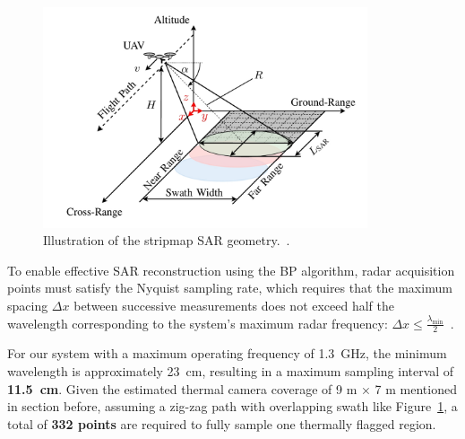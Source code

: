 \begin{figure}[H]
    \centering
    \includegraphics[height=6.5cm]{figs/Huirui/gpr_swath}
    \caption[Stripmap SAR geometry]{Illustration of the stripmap SAR geometry.~\cite{schartel2018uav}.}
    \label{fig:swath_geometry}
\end{figure}

To enable effective \gls{SAR} reconstruction using the \gls{BP} algorithm, radar acquisition points must satisfy the Nyquist sampling rate, which requires that the maximum spacing $\Delta x$ between successive measurements does not exceed half the wavelength corresponding to the system's maximum radar frequency: \(\Delta x \leq \frac{\lambda_{\text{min}}}{2}\)~\cite{9758040}.

For our system with a maximum operating frequency of 1.3~GHz, the minimum wavelength is approximately 23~cm, resulting in a maximum sampling interval of \textbf{11.5~cm}. Given the estimated thermal camera coverage of 9 m × 7 m mentioned in section before, assuming a zig-zag path with overlapping swath like Figure~\ref{fig:swath_geometry}, a total of \textbf{332 points} are required to fully sample one thermally flagged region. 